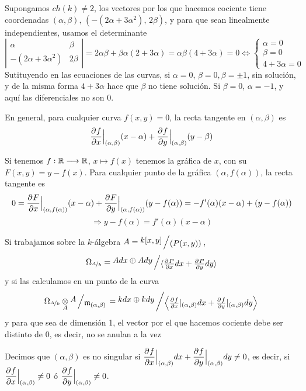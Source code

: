 \begin{ejem}
Supongamos $ch(k)\neq 2$, los vectores por los que hacemos cociente tiene coordenadas $(\alpha, \beta), \, (-(2\alpha+3\alpha^2), \, 2\beta)$, y para que sean linealmente independientes, usamos el determinante
$$\left|\begin{matrix}
    \alpha & \beta \\ -(2\alpha+3\alpha^2) & 2\beta 
\end{matrix} \right| = 2\alpha \beta + \beta \alpha (2+3\alpha) = \alpha\beta (4+3\alpha) = 0 \iff \begin{cases}
    \alpha=0 \\ \beta =0 \\ 4+3\alpha=0
\end{cases}$$
Sutituyendo en las ecuaciones de las curvas, si $\alpha=0$, $\beta=0,\beta=\pm 1$, sin soluci\'on, y de la misma forma $4+3\alpha$ hace que $\beta$ no tiene soluci\'on. Si $\beta = 0$, $\alpha=-1$, y aqu\'i las diferenciales no son 0. 
\end{ejem}
\begin{ejem}
    En general, para cualquier curva $f(x,y)=0$, la recta tangente en $(\alpha, \beta)$ es 
    $$\dfrac{\partial^{} f}{\partial x}\Big|_{(\alpha,\beta)}(x-\alpha) + \dfrac{\partial^{} f}{\partial y}\Big|_{(\alpha,\beta)}(y-\beta)$$

    Si tenemos $f: \mathbb{R} \longrightarrow \mathbb{R}$, $x \longmapsto f(x)$ tenemos la gr\'afica de $x$, con su $F(x,y) = y-f(x)$. Para cualquier punto de la gr\'afica $(\alpha, f(\alpha))$, la recta tangente es
    $$0=\dfrac{\partial^{} F}{\partial x}\Big|_{(\alpha, f(\alpha))} (x-\alpha) + \dfrac{\partial^{} F}{\partial y}\Big|_{(\alpha, f(\alpha))} (y-f(\alpha)) = -f'(\alpha)(x-\alpha) + (y-f(\alpha)) $$
    $$\Rightarrow y-f(\alpha) = f'(\alpha) (x-\alpha) $$
\end{ejem}
\begin{ejem}
    Si trabajamos sobre la $k$-\'algebra $A = \modulo{k[x,y]}{(P(x,y))}$, 
    $$\Omega_{\nicefrac{A}{k}} = \modulo{Adx\oplus Ady}{\langle \pdd{P}{x}dx+ \pdd{P}{y} dy \rangle}$$
    y si las calculamos en un punto de la curva
    $$\Omega_{\nicefrac{A}{k}} \underset{A}{\otimes} \modulo{A}{\m_{(\alpha,\beta)}} = \modulo{kdx \oplus k dy}{\left\langle \pdd{f}{x}|_{(\alpha,\beta)} dx + \pdd{f}{y}|_{(\alpha,\beta)}dy \right\rangle} $$
    y para que sea de dimensi\'on 1, el vector por el que hacemos cociente debe ser distinto de 0, es decir, no se anulan a la vez
\end{ejem}
\begin{defi}
    Decimos que $(\alpha, \beta)$ es no singular si $\dfrac{\partial^{} f}{\partial x}\Big|_{(\alpha,\beta)} dx + \dfrac{\partial^{} f}{\partial y}\Big|_{(\alpha,\beta)}dy \neq 0$, es decir, si $\dfrac{\partial^{} f}{\partial x}\Big|_{(\alpha,\beta)} \neq 0$ \'o $\dfrac{\partial^{} f}{\partial y}\Big|_{(\alpha,\beta)} \neq 0$.
\end{defi}

